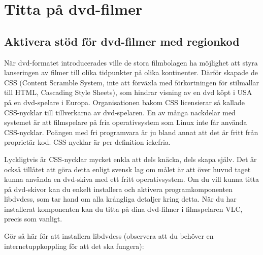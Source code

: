 \documentclass[a4paper,final]{memoir} %
\begin{document}

\section{Titta på dvd-filmer}

\subsection{Aktivera stöd för dvd-filmer med regionkod}


När dvd-formatet introducerades ville de stora filmbolagen ha möjlighet att styra lanseringen av filmer till olika tidpunkter på olika kontinenter. Därför skapade de CSS (Content Scramble System, inte att förväxla med förkortningen för stilmallar till HTML, Cascading Style Sheets), som hindrar visning av en dvd köpt i USA på en dvd-spelare i Europa. Organisationen bakom CSS licensierar så kallade CSS-nycklar till tillverkarna av dvd-spelaren. En av många nackdelar med systemet är att filmspelare på fria operativsystem som Linux inte får använda CSS-nycklar. Poängen med fri programvara är ju bland annat att det är fritt från proprietär kod. CSS-nycklar är per definition ickefria. 

Lyckligtvis är CSS-nycklar mycket enkla att dels knäcka, dels skapa själv. Det är också tillåtet att göra detta enligt svensk lag om målet är att över huvud taget kunna använda en dvd-skiva med ett fritt operativsystem. Om du vill kunna titta på dvd-skivor kan du enkelt installera och aktivera programkomponenten libdvdcss, som tar hand om alla krångliga detaljer kring detta. När du har installerat komponenten kan du titta på dina dvd-filmer  i filmspelaren VLC, precis som vanligt.

Gör så här för att installera libdvdcss (observera att du behöver en internetuppkoppling för att det ska fungera):
\end{document}
